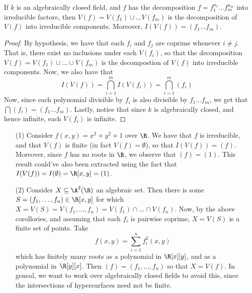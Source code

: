\begin{corollary}
    If $k$ is an algebraically closed field, and $f$ has the decomposition
    $f=f_1^{n_1} \dots f_m^{n_m}$ into irreducible factore, then $V(f)=V(f_1)
    \cup \dots V(f_m)$ is the decomposition of $V(f)$ into irreducible
    components. Moreover, $I(V(f))=(f_1 \dots f_m)$.
\end{corollary}
\begin{proof}
    By hypothesis, we have that each $f_i$ and $f_j$ are coprime whenever $i
    \neq j$. That is, there exist no inclusions under each $V(f_i)$, so that the
    decomposition $V(f)=V(f_1) \cup \dots \cup V(f_m)$ is the decompostion of
    $V(f)$ into irreducible components. Now, we also have that
    \begin{equation*}
        I(V(f))=\bigcap_{i=1}^m{I(V(f_i))}=\bigcap_{i=1}^m{(f_i)}
    \end{equation*}
    Now, since each polynomial divisible by $f_i$ is also divisible by $f_1
    \dots f_m$, we get that $\bigcap{(f_i)}=(f_1 \dots f_m)$. Lastly, notice
    that since $k$ is algebraically closed, and hence infinite, each $V(f_i)$ is
    infinite.
\end{proof}

\begin{example}\label{example_1.14}
    \begin{enumerate}
        \item[(1)] Consider $f(x,y)=x^2+y^2+1$ over $\R$. We have that $f$ is
            irreducible, and that $V(f)$ is finite (in fact $V(f)=\emptyset$),
            so that $I(V(f))=(f)$. Moreover, since $f$ has no roots in $\R$, we
            observe that $(f)=(1)$. This result could've also been extracted
            using the fact that $I(V(f))=I(\emptyset)=\R[x,y]=(1)$.

        \item[(2)] Consider $X \subseteq \A^2(\R)$ an algebraic set. Then there
            is some $S=(f_1, \dots, f_n) \in \R[x,y]$ for which $X=V(S)=V(f_1,
            \dots, f_n)=V(f_1) \cap \dots \cap V(f_n)$. Now, by the above
            corollories, and assuming that each $f_i$ is pairwise coprime,
            $X=V(S)$ is a finite set of points. Take
            \begin{equation*}
                f(x,y)=\sum_{i=1}^n{f_i^2(x,y)}
            \end{equation*}
            which has finitely many roots as a polynomial in $\R[x][y]$, and as
            a polynomial in $\R[y][x]$. Then $(f)=(f_1, \dots ,f_n)$ so that
            $X=V(f)$. In geneal, we want to work over algebraically closed
            fields to avoid this, since the intersections of hypersurfaces need
            not be finite.
    \end{enumerate}
\end{example}

